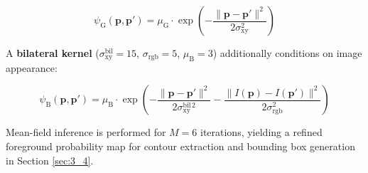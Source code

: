 $$
\psi_{\text{G}}(\mathbf{p}, \mathbf{p}') = \mu_{\text{G}} \cdot \exp\!\left(-\frac{\|\mathbf{p} - \mathbf{p}'\|^2}{2\sigma_{\text{xy}}^2}\right)
$$

A \textbf{bilateral kernel} ($\sigma_{\text{xy}}^{\text{bil}} = 15$, $\sigma_{\text{rgb}} = 5$, $\mu_{\text{B}} = 3$) additionally conditions on image appearance:

$$
\psi_{\text{B}}(\mathbf{p}, \mathbf{p}') = \mu_{\text{B}} \cdot \exp\!\left(-\frac{\|\mathbf{p} - \mathbf{p}'\|^2}{2\sigma_{\text{xy}}^{\text{bil}\,2}} - \frac{\|I(\mathbf{p}) - I(\mathbf{p}')\|^2}{2\sigma_{\text{rgb}}^2}\right)
$$

Mean-field inference is performed for $M = 6$ iterations, yielding a refined foreground probability map for contour extraction and bounding box generation in Section \ref{sec:3_4}.



\label{sec:3_4}
